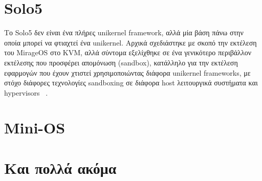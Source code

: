 \section{Solo5}

Το Solo5 δεν είναι ένα πλήρες unikernel framework, αλλά μία βάση πάνω στην οποία
μπορεί να φτιαχτεί ένα unikernel. Αρχικά σχεδιάστηκε με σκοπό την εκτέλεση του
MirageOS στο KVM, αλλά σύντομα εξελίχθηκε σε ένα γενικότερο περιβάλλον εκτέλεσης
που προσφέρει απομόνωση (sandbox), κατάλληλο για την εκτέλεση εφαρμογών που
έχουν χτιστεί χρησιμοποιώντας διάφορα unikernel frameworks, με στόχο διάφορες
τεχνολογίες sandboxing σε διάφορα host λειτουργικά συστήματα και hypervisors
~\cite{solo5_repo}.
\section{Mini-OS}
\section{Και πολλά ακόμα}
